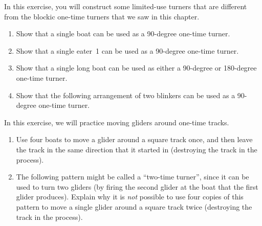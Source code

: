 \begin{multicols}{2}
\mfilbreak


\begin{problem}\label{exer:boat_one_time_turner}
	In this exercise, you will construct some limited-use turners that are different from the blockic one-time turners that we saw in this chapter.
	\begin{enumerate}[label=(\alph*)]
		\item Show that a single boat can be used as a 90-degree one-time turner.
		
		\item Show that a single eater~1 can be used as a 90-degree one-time turner.
		
		\item Show that a single long boat can be used as either a 90-degree or 180-degree one-time turner.
		
		\item Show that the following arrangement of two blinkers can be used as a 90-degree one-time turner.
		\begin{center}
		\end{center}
	\end{enumerate}
\end{problem}


\mfilbreak


\begin{problem}\label{exer:turner_tracks}
	In this exercise, we will practice moving gliders around one-time tracks.
	\begin{enumerate}[label=(\alph*)]
		\item Use four boats to move a glider around a square track once, and then leave the track in the same direction that it started in (destroying the track in the process).
		
		\item The following pattern might be called a ``two-time turner'', since it can be used to turn two gliders (by firing the second glider at the boat that the first glider produces). Explain why it is \emph{not} possible to use four copies of this pattern to move a single glider around a square track twice (destroying the track in the process).
		\begin{center}
		\end{center}
		

\end{enumerate}
\end{problem}
\end{multicols}
